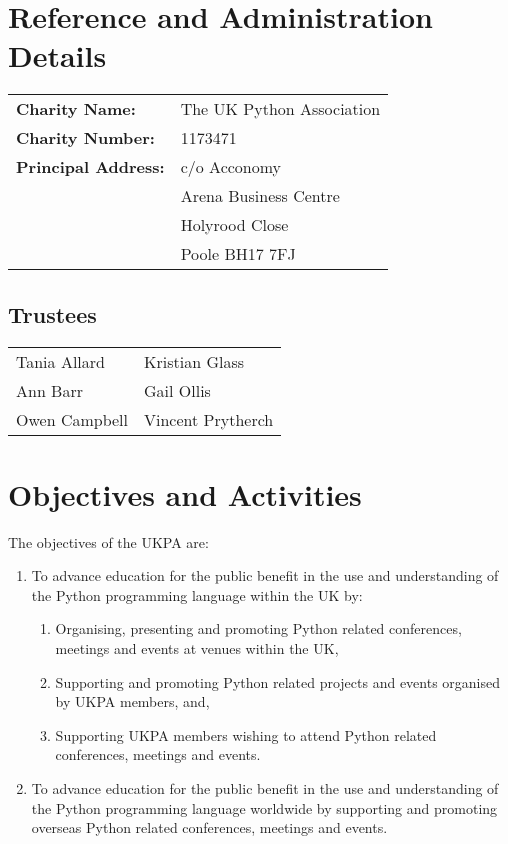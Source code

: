 \documentclass[11pt, final]{article}
\begin{document}

\section{Reference and Administration Details}
\begin{tabular}{l l}
	\textbf{Charity Name:}      & The UK Python Association \\
	\textbf{Charity Number:}    & 1173471                   \\
	\textbf{Principal Address:} & c/o Acconomy              \\
	                            & Arena Business Centre     \\
	                            & Holyrood Close            \\
	                            & Poole BH17 7FJ            \\
\end{tabular}

\subsection{Trustees}
\begin{tabular}{l l}
	Tania Allard  & Kristian Glass    \\
	Ann Barr      & Gail Ollis        \\
	Owen Campbell & Vincent Prytherch \\
\end{tabular}

\section{Objectives and Activities}
The objectives of the UKPA are:
\begin{enumerate}
	\item To advance education for the public benefit in the use and understanding of the Python programming language within the UK by:
	      \begin{enumerate}
		      \item Organising, presenting and promoting Python related conferences, meetings and events at venues within the UK,
		      \item Supporting and promoting Python related projects and events organised by UKPA members, and,
		      \item Supporting UKPA members wishing to attend Python related conferences, meetings and events.
	      \end{enumerate}
	\item To advance education for the public benefit in the use and understanding of the Python programming language worldwide by supporting and promoting overseas Python related conferences, meetings and events.
\end{enumerate}
\end{document}
